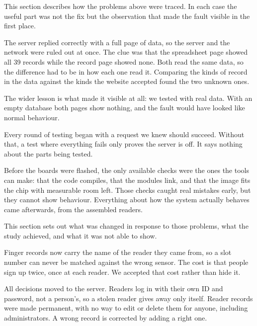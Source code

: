 
This section describes how the problems above were traced. In each case the useful part was not the fix but the observation that made the fault visible in the first place.


The server replied correctly with a full page of data, so the server and the
network were ruled out at once. The clue was that the spreadsheet page showed
all 39 records while the record page showed none. Both read the same data, so
the difference had to be in how each one read it. Comparing the kinds of record
in the data against the kinds the website accepted found the two unknown ones.

The wider lesson is what made it visible at all: we tested with real data. With
an empty database both pages show nothing, and the fault would have looked like
normal behaviour.


Every round of testing began with a request we knew should succeed. Without
that, a test where everything fails only proves the server is off. It says
nothing about the parts being tested.


Before the boards were flashed, the only available checks were the ones the
tools can make: that the code compiles, that the modules link, and that the
image fits the chip with measurable room left. Those checks caught real
mistakes early, but they cannot show behaviour. Everything about how the
system actually behaves came afterwards, from the assembled readers.


This section sets out what was changed in response to those problems, what the study achieved, and what it was not able to show.


Finger records now carry the name of the reader they came from, so a slot number
can never be matched against the wrong sensor. The cost is that people sign up
twice, once at each reader. We accepted that cost rather than hide it.

All decisions moved to the server. Readers log in with their own ID and
password, not a person's, so a stolen reader gives away only itself. Reader
records were made permanent, with no way to edit or delete them for anyone,
including administrators. A wrong record is corrected by adding a right one.

